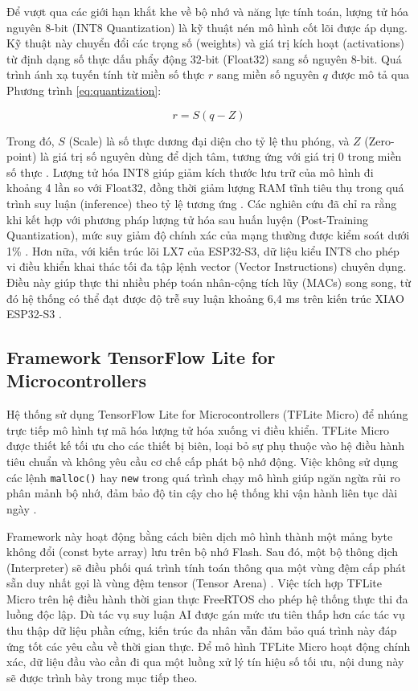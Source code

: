Để vượt qua các giới hạn khắt khe về bộ nhớ và năng lực tính toán, lượng tử hóa nguyên 8-bit (INT8 Quantization) là kỹ thuật nén mô hình cốt lõi được áp dụng. Kỹ thuật này chuyển đổi các trọng số (weights) và giá trị kích hoạt (activations) từ định dạng số thực dấu phẩy động 32-bit (Float32) sang số nguyên 8-bit. Quá trình ánh xạ tuyến tính từ miền số thực $r$ sang miền số nguyên $q$ được mô tả qua Phương trình \ref{eq:quantization}:

\begin{equation}
\label{eq:quantization}
r = S(q - Z)
\end{equation}

Trong đó, $S$ (Scale) là số thực dương đại diện cho tỷ lệ thu phóng, và $Z$ (Zero-point) là giá trị số nguyên dùng để dịch tâm, tương ứng với giá trị 0 trong miền số thực \cite{ref_1_14}. Lượng tử hóa INT8 giúp giảm kích thước lưu trữ của mô hình đi khoảng 4 lần so với Float32, đồng thời giảm lượng RAM tĩnh tiêu thụ trong quá trình suy luận (inference) theo tỷ lệ tương ứng \cite{ref_1_1, ref_1_14}. Các nghiên cứu đã chỉ ra rằng khi kết hợp với phương pháp lượng tử hóa sau huấn luyện (Post-Training Quantization), mức suy giảm độ chính xác của mạng thường được kiểm soát dưới 1\% \cite{ref_1_14}. Hơn nữa, với kiến trúc lõi LX7 của ESP32-S3, dữ liệu kiểu INT8 cho phép vi điều khiển khai thác tối đa tập lệnh vector (Vector Instructions) chuyên dụng. Điều này giúp thực thi nhiều phép toán nhân-cộng tích lũy (MACs) song song, từ đó hệ thống có thể đạt được độ trễ suy luận khoảng 6,4 ms trên kiến trúc XIAO ESP32-S3 \cite{ref_1_4, ref_1_15}.

\subsection{Framework TensorFlow Lite for Microcontrollers}

Hệ thống sử dụng TensorFlow Lite for Microcontrollers (TFLite Micro) để nhúng trực tiếp mô hình tự mã hóa lượng tử hóa xuống vi điều khiển. TFLite Micro được thiết kế tối ưu cho các thiết bị biên, loại bỏ sự phụ thuộc vào hệ điều hành tiêu chuẩn và không yêu cầu cơ chế cấp phát bộ nhớ động. Việc không sử dụng các lệnh \texttt{malloc()} hay \texttt{new} trong quá trình chạy mô hình giúp ngăn ngừa rủi ro phân mảnh bộ nhớ, đảm bảo độ tin cậy cho hệ thống khi vận hành liên tục dài ngày \cite{ref_1_13}.

Framework này hoạt động bằng cách biên dịch mô hình thành một mảng byte không đổi (const byte array) lưu trên bộ nhớ Flash. Sau đó, một bộ thông dịch (Interpreter) sẽ điều phối quá trình tính toán thông qua một vùng đệm cấp phát sẵn duy nhất gọi là vùng đệm tensor (Tensor Arena) \cite{ref_1_13}. Việc tích hợp TFLite Micro trên hệ điều hành thời gian thực FreeRTOS cho phép hệ thống thực thi đa luồng độc lập. Dù tác vụ suy luận AI được gán mức ưu tiên thấp hơn các tác vụ thu thập dữ liệu phần cứng, kiến trúc đa nhân vẫn đảm bảo quá trình này đáp ứng tốt các yêu cầu về thời gian thực. Để mô hình TFLite Micro hoạt động chính xác, dữ liệu đầu vào cần đi qua một luồng xử lý tín hiệu số tối ưu, nội dung này sẽ được trình bày trong mục tiếp theo.

